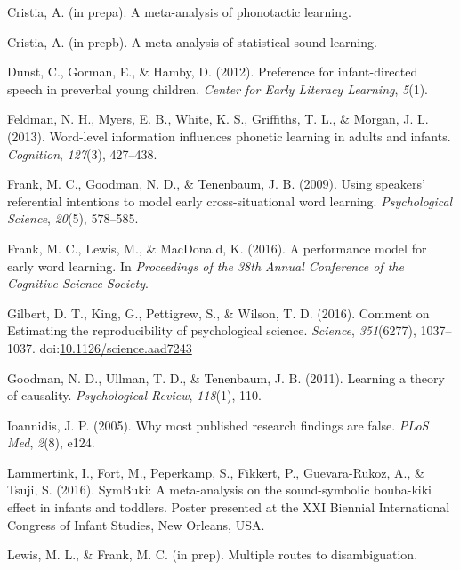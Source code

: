 \documentclass[english,floatsintext,man]{apa6}
\begin{document}
\hypertarget{ref-cristiaphonotacticsinprep}{}
Cristia, A. (in prepa). A meta-analysis of phonotactic learning.

\hypertarget{ref-cristiastatisticalinprep}{}
Cristia, A. (in prepb). A meta-analysis of statistical sound learning.

\hypertarget{ref-dunst2012preference}{}
Dunst, C., Gorman, E., \& Hamby, D. (2012). Preference for
infant-directed speech in preverbal young children. \emph{Center for
Early Literacy Learning}, \emph{5}(1).

\hypertarget{ref-feldman2013word}{}
Feldman, N. H., Myers, E. B., White, K. S., Griffiths, T. L., \& Morgan,
J. L. (2013). Word-level information influences phonetic learning in
adults and infants. \emph{Cognition}, \emph{127}(3), 427--438.

\hypertarget{ref-frank2009using}{}
Frank, M. C., Goodman, N. D., \& Tenenbaum, J. B. (2009). Using
speakers' referential intentions to model early cross-situational word
learning. \emph{Psychological Science}, \emph{20}(5), 578--585.

\hypertarget{ref-frank2016performance}{}
Frank, M. C., Lewis, M., \& MacDonald, K. (2016). A performance model
for early word learning. In \emph{Proceedings of the 38th Annual
Conference of the Cognitive Science Society}.

\hypertarget{ref-Gilbert1037}{}
Gilbert, D. T., King, G., Pettigrew, S., \& Wilson, T. D. (2016).
Comment on Estimating the reproducibility of psychological science.
\emph{Science}, \emph{351}(6277), 1037--1037.
doi:\href{https://doi.org/10.1126/science.aad7243}{10.1126/science.aad7243}

\hypertarget{ref-goodman2011learning}{}
Goodman, N. D., Ullman, T. D., \& Tenenbaum, J. B. (2011). Learning a
theory of causality. \emph{Psychological Review}, \emph{118}(1), 110.

\hypertarget{ref-ioannidis2005most}{}
Ioannidis, J. P. (2005). Why most published research findings are false.
\emph{PLoS Med}, \emph{2}(8), e124.

\hypertarget{ref-lammertink2016}{}
Lammertink, I., Fort, M., Peperkamp, S., Fikkert, P., Guevara-Rukoz, A.,
\& Tsuji, S. (2016). SymBuki: A meta-analysis on the sound-symbolic
bouba-kiki effect in infants and toddlers. Poster presented at the XXI
Biennial International Congress of Infant Studies, New Orleans, USA.

\hypertarget{ref-lfprep}{}
Lewis, M. L., \& Frank, M. C. (in prep). Multiple routes to
disambiguation.
\end{document}
